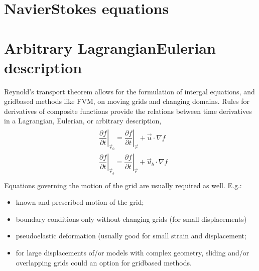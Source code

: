 \documentclass[letterpaper,10pt,english]{jupyterBook}
\begin{document}
\sphinxstepscope


\chapter{Navier\sphinxhyphen{}Stokes equations}
\label{\detokenize{ch/pde/ns:navier-stokes-equations}}\label{\detokenize{ch/pde/ns:pde-ns}}\label{\detokenize{ch/pde/ns::doc}}
\sphinxstepscope


\chapter{Arbitrary Lagrangian\sphinxhyphen{}Eulerian description}
\label{\detokenize{ch/pde/ale:arbitrary-lagrangian-eulerian-description}}\label{\detokenize{ch/pde/ale:pde-ale-description}}\label{\detokenize{ch/pde/ale::doc}}
\sphinxAtStartPar
Reynold’s transport theorem allows for the formulation of intergal equations, and grid\sphinxhyphen{}based methods like FVM, on moving grids and changing domains. Rules for derivatives of composite functions provide the relations between time derivatives in a Lagrangian, Eulerian, or arbitrary description,
\begin{equation*}
\begin{split}\begin{aligned}
  & \left.\dfrac{\partial f}{\partial t}\right|_{\vec{r}_0} = \left.\dfrac{\partial f}{\partial t}\right|_{\vec{r}} + \vec{u}   \cdot \nabla f \\
  & \left.\dfrac{\partial f}{\partial t}\right|_{\vec{r}_b} = \left.\dfrac{\partial f}{\partial t}\right|_{\vec{r}} + \vec{u}_b \cdot \nabla f \\
\end{aligned}\end{split}
\end{equation*}
\sphinxAtStartPar
Equations governing the motion of the grid are usually required as well. E.g.:
\begin{itemize}
\item {} 
\sphinxAtStartPar
known and prescribed motion of the grid;

\item {} 
\sphinxAtStartPar
boundary conditions only without changing grids (for small displacements)

\item {} 
\sphinxAtStartPar
pseudo\sphinxhyphen{}elastic deformation (usually good for small strain and displacement;

\item {} 
\sphinxAtStartPar
for large displacements of/or models with complex geometry, sliding and/or overlapping grids could an option for grid\sphinxhyphen{}based methods.

\end{itemize}
\end{document}
